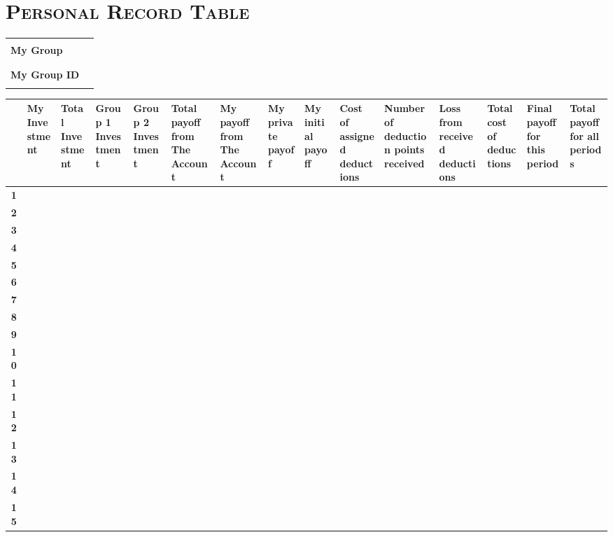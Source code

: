 \documentclass{article}
\begin{document}
\thispagestyle{empty}

\begin{sidewaystable}
\section*{\scshape Personal Record Table}
\small %
\setlength\tabcolsep{1.8pt} %

\medskip


\begin{tabu} to 0.3\textwidth { | X[c] | X[c] |}
   \hline
   &\\
   \textbf{My Group} & \\
   &\\
   \hline
    &\\
   \textbf{My Group ID}   &   \\
    &\\
   \hline
\end{tabu}

\medskip

\begin{tabularx}{\linewidth}{|c|*{14}{Y|}}
\hline
& \textbf{My Investment}
& \textbf{Total Investment}
& \textbf{Group 1 Investment}
& \textbf{Group 2 Investment}
& \textbf{Total payoff from The Account}
& \textbf{My payoff from The Account}
& \textbf{My private payoff}
& \textbf{My initial payoff}
& \textbf{Cost of assigned deductions}
& \textbf{Number of deduction points received}
& \textbf{Loss from received deductions}
& \textbf{Total cost of deductions}
& \textbf{Final payoff for this period}
& \textbf{Total payoff for all periods}\\
\hline\hline
\textbf{1} & & & & & & & & & & & & & &\\[2ex]\hline
\textbf{2} & & & & & & & & & & & & & &\\[2ex]\hline
\textbf{3} & & & & & & & & & & & & & &\\[2ex]\hline
\textbf{4} & & & & & & & & & & & & & &\\[2ex]\hline
\textbf{5} & & & & & & & & & & & & & &\\[2ex]\hline
\textbf{6} & & & & & & & & & & & & & &\\[2ex]\hline
\textbf{7} & & & & & & & & & & & & & &\\[2ex]\hline
\textbf{8} & & & & & & & & & & & & & &\\[2ex]\hline
\textbf{9} & & & & & & & & & & & & & &\\[2ex]\hline
\textbf{10} & & & & & & & & & & & & & &\\[2ex]\hline
\textbf{11} & & & & & & & & & & & & & &\\[2ex]\hline
\textbf{12} & & & & & & & & & & & & & &\\[2ex]\hline
\textbf{13} & & & & & & & & & & & & & &\\[2ex]\hline
\textbf{14} & & & & & & & & & & & & & &\\[2ex]\hline
\textbf{15} & & & & & & & & & & & & & &\\[2ex]\hline

\end{tabularx}
\end{sidewaystable}


\newpage
\end{document}
